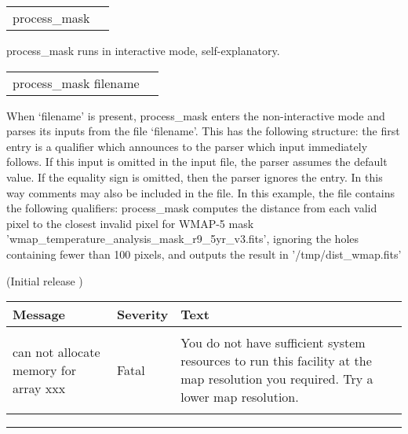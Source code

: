 \begin{examples}{1}
{
\begin{tabular}{ll} %
process\_mask  \\
\end{tabular}
}
{
process\_mask runs in interactive mode, self-explanatory.
}
\end{examples}

\vfill\newpage

\begin{examples}{2}
{
\begin{tabular}{ll} %
process\_mask  filename \\
\end{tabular}
}
{When `filename' is present, process\_mask enters the non-interactive mode and parses
its inputs from the file `filename'. This has the following
structure: the first entry is a qualifier which announces to the parser
which input immediately follows. If this input is omitted in the
input file, the parser assumes the default value.
If the equality sign is omitted, then the parser ignores the entry.
In this way comments may also be included in the file.
In this example, the file contains the following qualifiers:\hfill\newline
{}
}
process\_mask computes the distance from each valid pixel to the closest invalid
pixel for WMAP-5 mask 'wmap\_temperature\_analysis\_mask\_r9\_5yr\_v3.fits', ignoring
the holes containing fewer than 100 pixels, and outputs the result in '/tmp/dist\_wmap.fits'
\end{examples}

\begin{release}
  \begin{relist}
    \item (Initial release )
  \end{relist}
\end{release}

\begin{messages}
{
\begin{tabular}{p{0.25\hsize} p{0.1\hsize} p{0.35\hsize}} \hline  
  \textbf{Message} & \textbf{Severity} & \textbf{Text} \\ \hline
                   &                   &   \\ %
can not allocate memory for array xxx &  Fatal & You do not have
                   sufficient system resources to run this
                   facility at the map resolution you required. 
  Try a lower map resolution.  \\ 
                   &                   &   \\ \hline %
\end{tabular}
} 
\end{messages}

\rule{\hsize}{2mm}

\newpage
